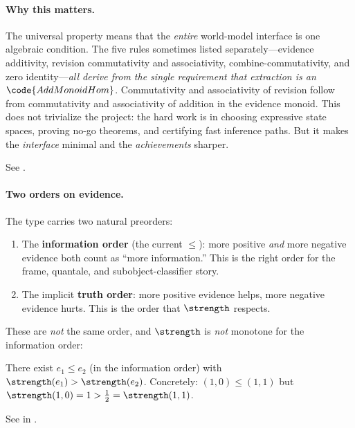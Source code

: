 \documentclass[11pt,openany]{report}
\begin{document}
\paragraph{Why this matters.}
The universal property means that the \emph{entire} world-model
interface is one algebraic condition.  The five rules sometimes listed
separately---evidence additivity, revision commutativity and
associativity, combine-commutativity, and zero
identity---\emph{all derive from the single requirement that
extraction is an $\code{AddMonoidHom}$}.  Commutativity and
associativity of revision follow from commutativity and associativity
of addition in the evidence monoid.  This does not trivialize the
project: the hard work is in choosing expressive state spaces, proving
no-go theorems, and certifying fast inference paths.  But it makes the
\emph{interface} minimal and the \emph{achievements} sharper.

See .

\paragraph{Two orders on evidence.}
The \Evidence{} type carries two natural preorders:
\begin{enumerate}
\item The \textbf{information order} (the current $\le$): more positive
  \emph{and} more negative evidence both count as ``more information.''
  This is the right order for the frame, quantale, and
  subobject-classifier story.
\item The implicit \textbf{truth order}: more positive evidence helps,
  more negative evidence hurts.  This is the order that $\strength$
  respects.
\end{enumerate}

\noindent
These are \emph{not} the same order, and $\strength$ is \emph{not}
monotone for the information order:

\begin{theorem}
\label{thm:strength-not-monotone}
There exist $e_1 \le e_2$ (in the information order) with
$\strength(e_1) > \strength(e_2)$.  Concretely:
$(1, 0) \le (1, 1)$ but $\strength(1, 0) = 1 > \tfrac{1}{2} =
\strength(1, 1)$.
\end{theorem}

\noindent
See  in
.
\end{document}
